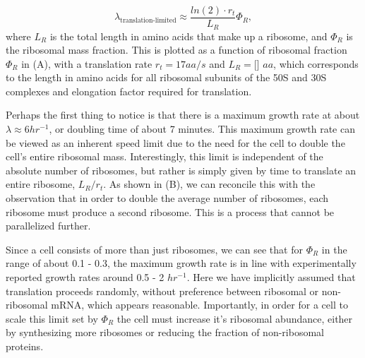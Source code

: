 \begin{equation}
\lambda_{\textrm{translation-limited}} \approx \frac{ln(2) \cdot r_t}{L_R}  \Phi_R,
\label{eq:translation_limit_growth_rate}
\end{equation}
where $L_R$ is the total length in amino acids that make up a ribosome, and
$\Phi_R$ is the ribosomal mass fraction. This is plotted as a function of
ribosomal fraction $\Phi_R$ in (A), with a translation rate
$r_t = 17 aa/s$ and $L_R = $[] $aa$, which corresponds to the length in amino
acids for all ribosomal subunits of the 50S and 30S complexes and elongation
factor required for translation.

Perhaps the first thing to notice is that there is a maximum growth rate at
about $\lambda \approx 6 hr^{-1}$, or doubling time of
about 7 minutes. This maximum growth rate can be viewed as an inherent speed
limit due to the need for the cell to double the cell's entire ribosomal mass.
Interestingly, this limit is independent of the absolute number of ribosomes,
but rather  is simply given by time to translate an entire ribosome, $L_R/ r_t$.
As shown in (B),  we can reconcile this with the observation
that in order  to double the average number of ribosomes, each ribosome must
produce a second  ribosome. This is a process that cannot be parallelized
further.



Since a cell consists of more than just ribosomes, we can see that for $\Phi_R$
in the range of about 0.1 - 0.3, the maximum growth rate is in line with
experimentally reported growth rates around 0.5 - 2 $hr^{-1}$. Here we have
implicitly assumed that translation proceeds randomly, without preference
between ribosomal or non-ribosomal mRNA, which appears reasonable. Importantly,
in order for a cell to scale this limit set by $\Phi_R$ the cell must increase
it's ribosomal abundance, either by synthesizing more ribosomes or reducing the
fraction of non-ribosomal proteins.

